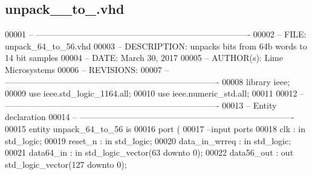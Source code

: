 \subsection{unpack\+\_\+\_\+to\+\_.\+vhd}
\label{unpack__64__to__56_8vhd_source}

\begin{DoxyCode}
00001 \textcolor{keyword}{-- ---------------------------------------------------------------------------- }
00002 \textcolor{keyword}{-- FILE:    unpack\_64\_to\_56.vhd}
00003 \textcolor{keyword}{-- DESCRIPTION: unpacks bits from 64b words to 14 bit samples}
00004 \textcolor{keyword}{-- DATE:    March 30, 2017}
00005 \textcolor{keyword}{-- AUTHOR(s):   Lime Microsystems}
00006 \textcolor{keyword}{-- REVISIONS:}
00007 \textcolor{keyword}{-- ---------------------------------------------------------------------------- }
00008 \textcolor{vhdlkeyword}{library }\textcolor{keywordflow}{ieee};
00009 \textcolor{vhdlkeyword}{use }ieee.std\_logic\_1164.\textcolor{keywordflow}{all};
00010 \textcolor{vhdlkeyword}{use }ieee.numeric\_std.\textcolor{keywordflow}{all};
00011 
00012 \textcolor{keyword}{-- ----------------------------------------------------------------------------}
00013 \textcolor{keyword}{-- Entity declaration}
00014 \textcolor{keyword}{-- ----------------------------------------------------------------------------}
00015 \textcolor{keywordflow}{entity }unpack_64_to_56 \textcolor{keywordflow}{is}
00016   \textcolor{keywordflow}{port} \textcolor{vhdlchar}{(}
00017 \textcolor{keyword}{      --input ports }
00018       \textcolor{vhdlchar}{clk}               \textcolor{vhdlchar}{:} \textcolor{keywordflow}{in} \textcolor{comment}{std\_logic};
00019       \textcolor{vhdlchar}{reset_n}           \textcolor{vhdlchar}{:} \textcolor{keywordflow}{in} \textcolor{comment}{std\_logic};
00020         \textcolor{vhdlchar}{data_in_wrreq}   \textcolor{vhdlchar}{:} \textcolor{keywordflow}{in} \textcolor{comment}{std\_logic};
00021         \textcolor{vhdlchar}{data64_in}       \textcolor{vhdlchar}{:} \textcolor{keywordflow}{in} \textcolor{comment}{std\_logic\_vector}\textcolor{vhdlchar}{(}\textcolor{vhdllogic}{}\textcolor{vhdllogic}{63} \textcolor{keywordflow}{downto} \textcolor{vhdllogic}{}\textcolor{vhdllogic}{0}\textcolor{vhdlchar}{)};
00022         \textcolor{vhdlchar}{data56_out}      \textcolor{vhdlchar}{:} \textcolor{keywordflow}{out} \textcolor{comment}{std\_logic\_vector}\textcolor{vhdlchar}{(}\textcolor{vhdllogic}{}\textcolor{vhdllogic}{127} \textcolor{keywordflow}{downto} \textcolor{vhdllogic}{}\textcolor{vhdllogic}{0}\textcolor{vhdlchar}{)};

\end{DoxyCode}
